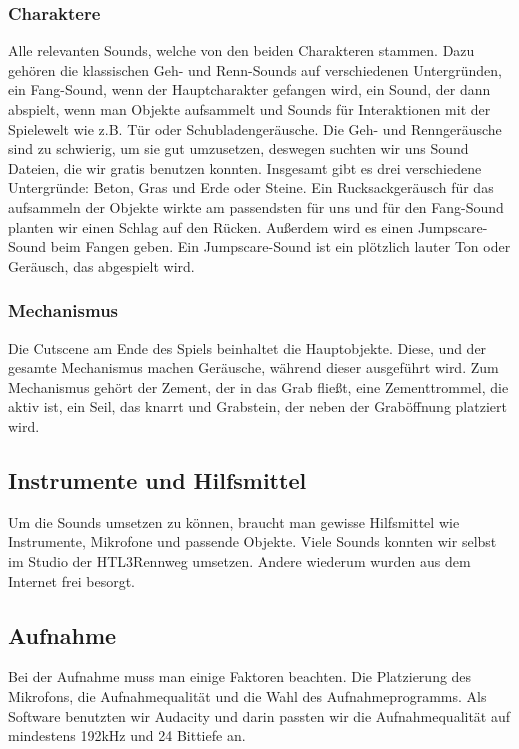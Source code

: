 \subsubsection{Charaktere}
Alle relevanten Sounds, welche von den beiden Charakteren stammen. Dazu gehören die klassischen Geh- und Renn-Sounds auf
verschiedenen Untergründen, ein Fang-Sound, wenn der Hauptcharakter gefangen wird, ein Sound, der dann abspielt, wenn man Objekte aufsammelt
und Sounds für Interaktionen mit der Spielewelt wie z.B. Tür oder Schubladengeräusche. Die Geh- und Renngeräusche sind zu
schwierig, um sie gut umzusetzen, deswegen suchten wir uns Sound Dateien, die wir gratis benutzen konnten. Insgesamt gibt es drei
verschiedene Untergründe: Beton, Gras und Erde oder Steine. Ein Rucksackgeräusch für das aufsammeln der Objekte wirkte am passendsten für uns
und für den Fang-Sound planten wir einen Schlag auf den Rücken.
Außerdem wird es einen Jumpscare-Sound beim Fangen geben. Ein Jumpscare-Sound ist ein plötzlich lauter Ton oder Geräusch, das abgespielt wird.

\subsubsection{Mechanismus}
Die Cutscene am Ende des Spiels beinhaltet die Hauptobjekte. Diese, und der gesamte Mechanismus
machen Geräusche, während dieser ausgeführt wird. Zum Mechanismus gehört der Zement,
der in das Grab fließt, eine Zementtrommel, die aktiv ist, ein Seil, das knarrt und Grabstein, der neben der Graböffnung platziert wird.

\subsection{Instrumente und Hilfsmittel}
Um die Sounds umsetzen zu können, braucht man gewisse Hilfsmittel wie Instrumente, Mikrofone und
passende Objekte. Viele Sounds konnten wir selbst im Studio der HTL3Rennweg umsetzen. Andere wiederum wurden aus dem Internet frei besorgt.

\subsection{Aufnahme}
Bei der Aufnahme muss man einige Faktoren beachten. Die Platzierung des Mikrofons, die Aufnahmequalität und die Wahl
des Aufnahmeprogramms. Als Software benutzten wir Audacity und darin passten wir die Aufnahmequalität auf mindestens 192kHz und 24 Bittiefe an.

